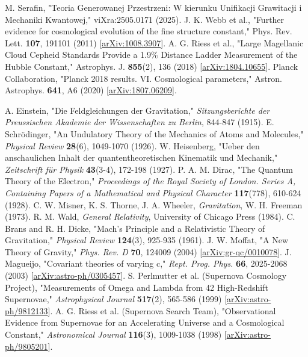 \documentclass[11pt,a4paper]{article}
\begin{document}
\begin{thebibliography}{99}
 M. Serafin, "Teoria Generowanej Przestrzeni: W kierunku Unifikacji Grawitacji i Mechaniki Kwantowej," viXra:2505.0171 (2025). 
 J. K. Webb et al., "Further evidence for cosmological evolution of the fine structure constant," Phys. Rev. Lett. \textbf{107}, 191101 (2011) [\url{arXiv:1008.3907}]. 
 A. G. Riess et al., "Large Magellanic Cloud Cepheid Standards Provide a 1.9\% Distance Ladder Measurement of the Hubble Constant," Astrophys. J. \textbf{855}(2), 136 (2018) [\url{arXiv:1804.10655}]. 
 Planck Collaboration, "Planck 2018 results. VI. Cosmological parameters," Astron. Astrophys. \textbf{641}, A6 (2020) [\url{arXiv:1807.06209}]. 

 A. Einstein, "Die Feldgleichungen der Gravitation," \textit{Sitzungsberichte der Preussischen Akademie der Wissenschaften zu Berlin}, 844-847 (1915). 
 E. Schr\"odinger, "An Undulatory Theory of the Mechanics of Atoms and Molecules," \textit{Physical Review} \textbf{28}(6), 1049-1070 (1926). 
 W. Heisenberg, "Ueber den anschaulichen Inhalt der quantentheoretischen Kinematik und Mechanik," \textit{Zeitschrift f\"ur Physik} \textbf{43}(3-4), 172-198 (1927). 
 P. A. M. Dirac, "The Quantum Theory of the Electron," \textit{Proceedings of the Royal Society of London. Series A, Containing Papers of a Mathematical and Physical Character} \textbf{117}(778), 610-624 (1928). 
 C. W. Misner, K. S. Thorne, J. A. Wheeler, \textit{Gravitation}, W. H. Freeman (1973). 
 R. M. Wald, \textit{General Relativity}, University of Chicago Press (1984). 
 C. Brans and R. H. Dicke, "Mach's Principle and a Relativistic Theory of Gravitation," \textit{Physical Review} \textbf{124}(3), 925-935 (1961). 
 J. W. Moffat, "A New Theory of Gravity," \textit{Phys. Rev. D} \textbf{70}, 124009 (2004) [\url{arXiv:gr-qc/0010078}]. 
 J. Magueijo, "Covariant theories of varying c," \textit{Rept. Prog. Phys.} \textbf{66}, 2025-2068 (2003) [\url{arXiv:astro-ph/0305457}]. 
 S. Perlmutter et al. (Supernova Cosmology Project), "Measurements of Omega and Lambda from 42 High-Redshift Supernovae," \textit{Astrophysical Journal} \textbf{517}(2), 565-586 (1999) [\url{arXiv:astro-ph/9812133}]. 
 A. G. Riess et al. (Supernova Search Team), "Observational Evidence from Supernovae for an Accelerating Universe and a Cosmological Constant," \textit{Astronomical Journal} \textbf{116}(3), 1009-1038 (1998) [\url{arXiv:astro-ph/9805201}]. 

\end{thebibliography}
\end{document}

